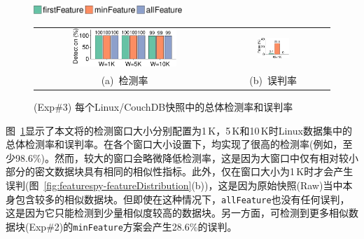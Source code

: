 \begin{figure}[!htb]
    \centering
    \includegraphics[width=0.5\textwidth]{pic/featurespy/plot/detection/overall/effectiveness-falsePositive_legend.pdf}
    \vspace{5pt}\\
    \begin{tabular}{@{\ }c@{\ }c}
        \includegraphics[width=0.6\textwidth]{pic/featurespy/plot/detection/overall/effectivenessLinux.pdf} &
        \includegraphics[width=0.3\textwidth]{pic/featurespy/plot/detection/overall/falsePositiveLinux.pdf}   \\
        \mbox{\small (a) 检测率}                                                                            &
        \mbox{\small (b) 误判率}                                                                              \\
    \end{tabular}
    \caption{(Exp\#3) 每个Linux/CouchDB快照中的总体检测率和误判率}
    \label{fig:featurespy-expDetectionOverallFalsePositive}
\end{figure}

图~\ref{fig:featurespy-expDetectionOverallFalsePositive}显示了本文将\sysnameF 的检测窗口大小分别配置为1\,K，5\,K和10\,K时Linux数据集中的总体检测率和误判率。在各个窗口大小设置下，\sysnameF 均实现了很高的检测率(例如，至少98.6\%)。然而，较大的窗口会略微降低检测率，这是因为大窗口中仅有相对较小部分的密文数据块具有相同的相似性指标。此外，\sysnameF 仅在窗口大小为1\,K时才会产生误判(图~\ref{fig:featurespy-featureDistribution}(b))，这是因为原始快照(Raw)当中本身包含较多的相似数据块。但即使在这种情况下，{\tt allFeature}也没有任何误判，这是因为它只能检测到少量相似度较高的数据块。另一方面，可检测到更多相似数据块(Exp\#2)的{\tt minFeature}方案会产生28.6\%的误判。


